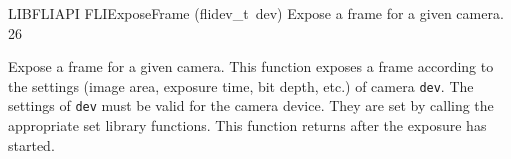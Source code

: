 \documentclass{article}
\begin{document}
\begin{cxxfunction}
{LIBFLIAPI}
        {FLIExposeFrame}
        {(flidev\_t\ dev)}
        {
 Expose a frame for a given camera.}
        {26}
\begin{cxxdoc}

Expose a frame for a given camera.  This function exposes a frame
according to the settings (image area, exposure time, bit depth,
etc.) of camera \texttt{dev}.  The settings of \texttt{dev} must be
valid for the camera device.  They are set by calling the
appropriate set library functions.  This function returns after the
exposure has started.


\end{cxxdoc}
\end{cxxfunction}
\end{document}
